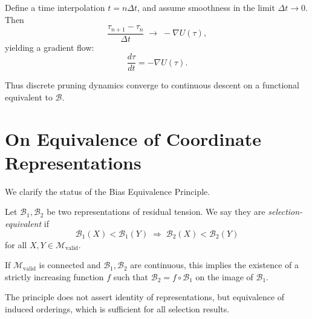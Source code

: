 \documentclass[11pt]{article}
\theoremstyle{plain}
\theoremstyle{definition}
\theoremstyle{remark}
\begin{document}
Define a time interpolation $t = n\Delta t$, and assume smoothness in the limit $\Delta t \to 0$. Then
\[
\frac{\tau_{n+1} - \tau_n}{\Delta t} \;\to\; -\nabla U(\tau),
\]
yielding a gradient flow:
\[
\frac{d\tau}{dt} = -\nabla U(\tau).
\]

Thus discrete pruning dynamics converge to continuous descent on a functional equivalent to $\mathcal{B}$.

\section{On Equivalence of Coordinate Representations}

We clarify the status of the Bias Equivalence Principle.

Let $\mathcal{B}_1, \mathcal{B}_2$ be two representations of residual tension. We say they are \emph{selection-equivalent} if
\[
\mathcal{B}_1(X) < \mathcal{B}_1(Y) \;\Rightarrow\; \mathcal{B}_2(X) < \mathcal{B}_2(Y)
\]
for all $X, Y \in \mathcal{M}_{\mathrm{valid}}$.

If $\mathcal{M}_{\mathrm{valid}}$ is connected and $\mathcal{B}_1, \mathcal{B}_2$ are continuous, this implies the existence of a strictly increasing function $f$ such that $\mathcal{B}_2 = f \circ \mathcal{B}_1$ on the image of $\mathcal{B}_1$.

The principle does not assert identity of representations, but equivalence of induced orderings, which is sufficient for all selection results.
\end{document}
